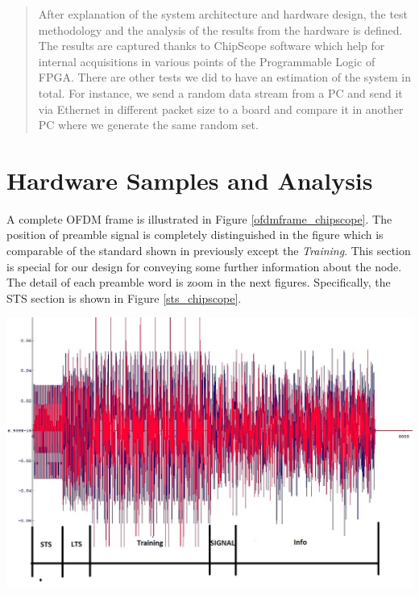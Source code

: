 \begin{abstract}
After explanation of the system architecture and hardware design, the test methodology and the analysis of the results from the hardware is defined. The results are captured thanks to ChipScope software which help for internal acquisitions in various points of the Programmable Logic of FPGA. There are other tests we did to have an estimation of the system in total. For instance, we send a random data stream from a PC and send it via Ethernet in different packet size to a board and compare it in another PC where we generate the same random set.\\
\end{abstract}

\section{Hardware Samples and Analysis}
\label{hw_samples}

A complete OFDM frame is illustrated in Figure \ref{ofdmframe_chipscope}. The position of preamble signal is completely distinguished in the figure which is comparable of the standard shown in previously except the \textit{Training}. This section is special for our design for conveying some further information about the node. The detail of each preamble word is zoom in the next figures. Specifically, the STS section is shown in Figure \ref{sts_chipscope}.\\
\begin{center}
\includegraphics[width=\textwidth]{content/fig/ofdmframe_chipscope.JPG}
\label{ofdmframe_chipscope}
\end{center}

